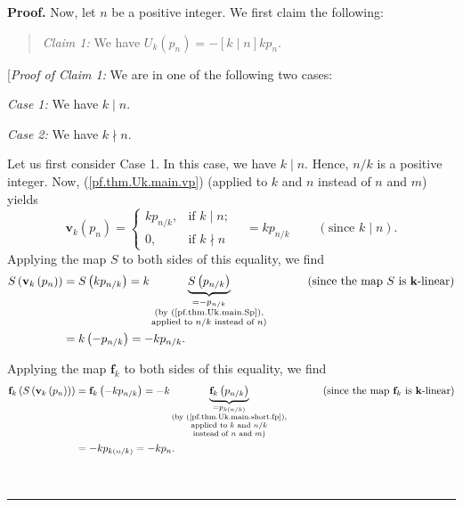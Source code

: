 \documentclass[numbers=enddot,12pt,final,onecolumn,notitlepage]{scrartcl}%
\theoremstyle{definition}
\newenvironment{statement}{\begin{quote}}{\end{quote}}
\newenvironment{proof}[1][Proof]{\noindent\textbf{#1.} }{\ \rule{0.5em}{0.5em}}
\newenvironment{vershort}{}{}
\begin{document}
\begin{proof}
Now, let $n$ be a positive integer. We first claim the following:

\begin{statement}
\textit{Claim 1:} We have $U_{k}\left(  p_{n}\right)  =-\left[  k\mid
n\right]  kp_{n}$.
\end{statement}

[\textit{Proof of Claim 1:} We are in one of the following two cases:

\textit{Case 1:} We have $k\mid n$.

\textit{Case 2:} We have $k\nmid n$.

Let us first consider Case 1. In this case, we have $k\mid n$. Hence, $n/k$ is
a positive integer. Now, (\ref{pf.thm.Uk.main.vp}) (applied to $k$ and $n$
instead of $n$ and $m$) yields%
\[
\mathbf{v}_{k}\left(  p_{n}\right)  =%
\begin{cases}
kp_{n/k}, & \text{if }k\mid n;\\
0, & \text{if }k\nmid n
\end{cases}
\ \ \ \ =kp_{n/k}\ \ \ \ \ \ \ \ \ \ \left(  \text{since }k\mid n\right)  .
\]
Applying the map $S$ to both sides of this equality, we find%
\begin{align*}
S\left(  \mathbf{v}_{k}\left(  p_{n}\right)  \right)   &  =S\left(
kp_{n/k}\right)  =k\underbrace{S\left(  p_{n/k}\right)  }_{\substack{=-p_{n/k}%
\\\text{(by (\ref{pf.thm.Uk.main.Sp}),}\\\text{applied to }n/k\text{ instead
of }n\text{)}}}\ \ \ \ \ \ \ \ \ \ \left(  \text{since the map }S\text{ is
}\mathbf{k}\text{-linear}\right) \\
&  =k\left(  -p_{n/k}\right)  =-kp_{n/k}.
\end{align*}


\begin{vershort}
\noindent Applying the map $\mathbf{f}_{k}$ to both sides of this equality, we
find
\begin{align*}
\mathbf{f}_{k}\left(  S\left(  \mathbf{v}_{k}\left(  p_{n}\right)  \right)
\right)   &  =\mathbf{f}_{k}\left(  -kp_{n/k}\right)
=-k\underbrace{\mathbf{f}_{k}\left(  p_{n/k}\right)  }_{\substack{=p_{k\left(
n/k\right)  }\\\text{(by (\ref{pf.thm.Uk.main.short.fp}),}\\\text{applied to
}k\text{ and }n/k\\\text{instead of }n\text{ and }m\text{)}}%
}\ \ \ \ \ \ \ \ \ \ \left(  \text{since the map }\mathbf{f}_{k}\text{ is
}\mathbf{k}\text{-linear}\right) \\
&  =-kp_{k\left(  n/k\right)  }=-kp_{n}.
\end{align*}


\end{vershort}
\end{proof}
\end{document}
